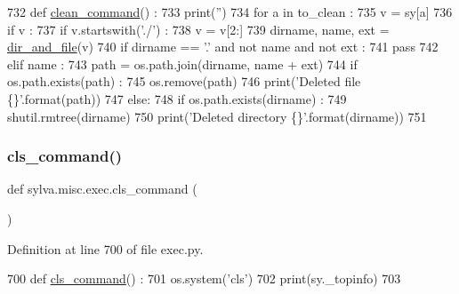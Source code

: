 \begin{DoxyCode}
732 \textcolor{keyword}{def }\hyperlink{namespacesylva_1_1misc_1_1exec_a57af053cb45645bf285643c3a4f449f4}{clean\_command}() :
733   print(\textcolor{stringliteral}{''})
734   \textcolor{keywordflow}{for} a \textcolor{keywordflow}{in} to\_clean :
735     v = sy[a]
736     \textcolor{keywordflow}{if} v :
737       \textcolor{keywordflow}{if} v.startswith(\textcolor{stringliteral}{'./'}) :
738         v = v[2:]
739       dirname, name, ext = \hyperlink{namespacesylva_1_1misc_1_1util_a0ce6d1d719234031353b60ac60f2af0d}{dir\_and\_file}(v)
740       \textcolor{keywordflow}{if} dirname == \textcolor{stringliteral}{'.'} \textcolor{keywordflow}{and} \textcolor{keywordflow}{not} name \textcolor{keywordflow}{and} \textcolor{keywordflow}{not} ext :
741         \textcolor{keywordflow}{pass}
742       \textcolor{keywordflow}{elif} name :
743         path = os.path.join(dirname, name + ext)
744         \textcolor{keywordflow}{if} os.path.exists(path) :
745           os.remove(path)
746           print(\textcolor{stringliteral}{'Deleted file \{\}'}.format(path))
747       \textcolor{keywordflow}{else}:
748         \textcolor{keywordflow}{if} os.path.exists(dirname) :
749           shutil.rmtree(dirname)
750           print(\textcolor{stringliteral}{'Deleted directory \{\}'}.format(dirname))
751 
\end{DoxyCode}
\mbox{\label{namespacesylva_1_1misc_1_1exec_aef271c6d1dab8f9f3e66ab76cdecbf42}} 
\subsubsection{\texorpdfstring{cls\+\_\+command()}{cls\_command()}}
{\footnotesize\ttfamily def sylva.\+misc.\+exec.\+cls\+\_\+command (\begin{DoxyParamCaption}{ }\end{DoxyParamCaption})}



Definition at line 700 of file exec.\+py.


\begin{DoxyCode}
700 \textcolor{keyword}{def }\hyperlink{namespacesylva_1_1misc_1_1exec_aef271c6d1dab8f9f3e66ab76cdecbf42}{cls\_command}() :
701   os.system(\textcolor{stringliteral}{'cls'})
702   print(sy.\_topinfo)
703 
\end{DoxyCode}
\mbox{\label{namespacesylva_1_1misc_1_1exec_afdee869cb32b6c18b9747718ac8dc475}} 
